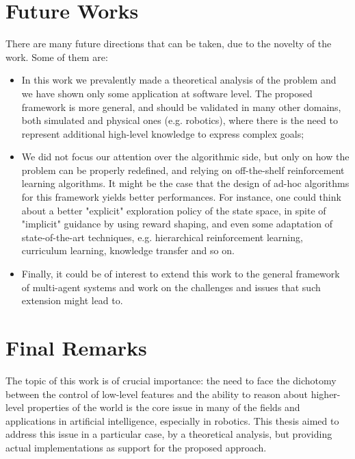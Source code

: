 \section{Future Works}
There are many future directions that can be taken, due to the novelty of the work. Some of them are:
\begin{itemize}
	\item In this work we prevalently made a theoretical analysis of the problem and we have shown only some application at software level. The proposed framework is more general, and should be validated in many other domains, both simulated and physical ones (e.g. robotics), where there is the need to represent additional high-level knowledge to express complex goals;
	\item We did not focus our attention over the algorithmic side, but only on how the problem can be properly redefined, and relying on off-the-shelf reinforcement learning algorithms. It might be the case that the design of ad-hoc algorithms for this framework yields better performances. For instance, one could think about a better "explicit" exploration policy of the state space, in spite of "implicit" guidance by using reward shaping, and even some adaptation of state-of-the-art techniques, e.g. hierarchical reinforcement learning, curriculum learning, knowledge transfer and so on.
	\item Finally, it could be of interest to extend this work to the general framework of multi-agent systems and work on the challenges and issues that such extension might lead to.
\end{itemize}

\section{Final Remarks}
The topic of this work is of crucial importance: the need to face the dichotomy between the control of low-level features and the ability to reason about higher-level properties of the world is the core issue in many of the fields and applications in artificial intelligence, especially in robotics. This thesis aimed to address this issue in a particular case, by a theoretical analysis, but providing actual implementations as support for the proposed approach.